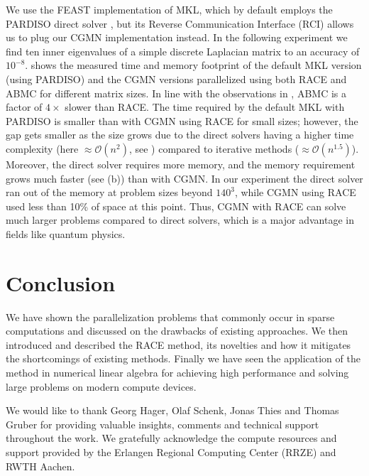 We use the FEAST implementation of \acrshort{MKL}, which by default employs
the PARDISO direct solver \cite{Pardiso}, but  its Reverse Communication Interface (RCI) allows us  to plug our CGMN implementation instead. In the following experiment we find ten inner eigenvalues of a simple discrete Laplacian matrix to an accuracy of $10^{-8}$.
 shows the measured time and memory footprint of
the default MKL version (using PARDISO) and the CGMN versions
 parallelized using both \acrshort{RACE} and \acrshort{ABMC}
for different matrix sizes. In line
with the observations in , \acrshort{ABMC}
is a factor of $4\times$ slower than \acrshort{RACE}.
The time required by the default MKL with PARDISO is smaller than with CGMN using \acrshort{RACE} for small sizes; however, the gap gets smaller as the 
size grows due to the direct solvers having a higher time complexity
(here $\approx \mathcal{O}(n^{2})$, see ) compared to
iterative methods ($\approx \mathcal{O}(n^{1.5})$).
Moreover, the direct solver requires more memory, and the memory
requirement grows much faster (see (b)) than
with CGMN. 
In our experiment the direct solver ran out of the memory at problem sizes
beyond $140^3$, while CGMN using \acrshort{RACE} used less than 10\%
of space at this point. Thus, CGMN with \acrshort{RACE} can solve much larger 
problems compared to direct solvers, which is a major advantage 
in fields like quantum physics.

\section*{Conclusion}
We have shown the parallelization problems that commonly occur in sparse
computations and discussed on the drawbacks of existing approaches.
We  then introduced and described the \acrshort{RACE} method, its novelties
and how it mitigates the shortcomings of existing methods.
Finally we have seen the application of the method in numerical 
linear algebra for achieving high performance and solving large 
problems on modern compute devices.


\clearpage


\begin{acks}
We would like to thank Georg Hager, Olaf Schenk, Jonas Thies and Thomas Gruber
 for providing valuable insights, comments and technical support throughout the 
 work.  We gratefully acknowledge the compute resources and support provided by
 the Erlangen Regional Computing Center (RRZE) and RWTH Aachen.
\end{acks}


